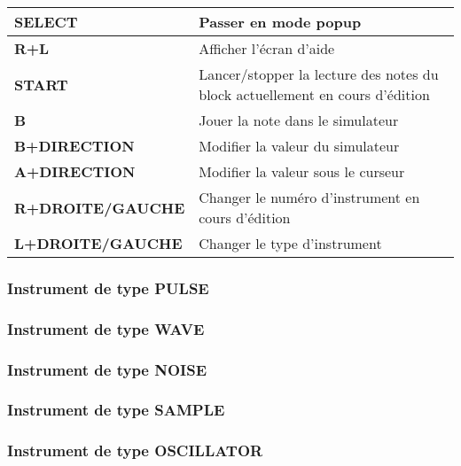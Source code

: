 \tablelasttail{\hline}
\begin{supertabular}{|l|p{11cm}|}
\hline
    {\bf SELECT} & Passer en mode popup \\
    \hline
    {\bf R+L} & Afficher l'écran d'aide \\
    \hline
    {\bf START} & Lancer/stopper la lecture des notes du block actuellement en cours d'édition \\
    \hline
    {\bf B} & Jouer la note dans le simulateur \\
    \hline
    {\bf B+DIRECTION} & Modifier la valeur du simulateur \\
    \hline
    {\bf A+DIRECTION} & Modifier la valeur sous le curseur \\
    \hline
    {\bf R+DROITE/GAUCHE} & Changer le numéro d'instrument en cours d'édition \\
    \hline
    {\bf L+DROITE/GAUCHE} & Changer le type d'instrument \\
\hline
\end{supertabular}

\subsubsection{Instrument de type PULSE}


\subsubsection{Instrument de type WAVE}


\subsubsection{Instrument de type NOISE}


\subsubsection{Instrument de type SAMPLE}


\subsubsection{Instrument de type OSCILLATOR}

